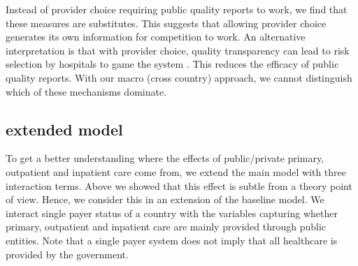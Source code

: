 \documentclass[12pt,english,a4paper]{article}
\begin{document}
Instead of provider choice requiring public quality reports to work, we find that these measures are substitutes. This suggests that allowing provider choice generates its own information for competition to work. An alternative interpretation is that with provider choice, quality transparency can lead to risk selection by hospitals to game the system \citep{dranoveReportCards2003}. This reduces the efficacy of public quality reports. With our macro (cross country) approach, we cannot distinguish which of these mechanisms dominate.

\subsection{extended model}
\label{sec:org71772a6}

To get a better understanding where the effects of public/private primary, outpatient and inpatient care come from, we extend the main model with three interaction terms. Above we showed that this effect is subtle from a theory point of view. Hence, we consider this in an extension of the baseline model. We interact single payer status of a country with the variables capturing whether primary, outpatient and inpatient care are mainly provided through public entities. Note that a single payer system does not imply that all healthcare is provided by the government.
\end{document}

